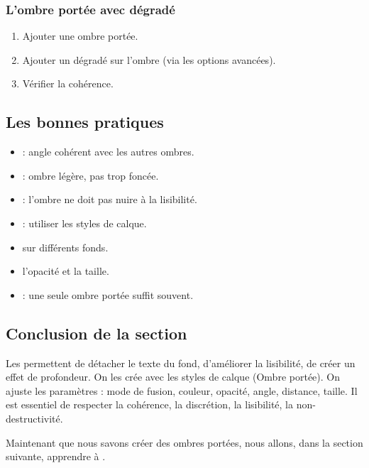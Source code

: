 \subsubsection{L'ombre portée avec dégradé}

\begin{enumerate}
    \item Ajouter une ombre portée.
    \item Ajouter un dégradé sur l'ombre (via les options avancées).
    \item Vérifier la cohérence.
\end{enumerate}

\subsection{Les bonnes pratiques}

\begin{itemize}
    \item {} : angle cohérent avec les autres ombres.
    \item {} : ombre légère, pas trop foncée.
    \item {} : l'ombre ne doit pas nuire à la lisibilité.
    \item {} : utiliser les styles de calque.
    \item {} sur différents fonds.
    \item {} l'opacité et la taille.
    \item {} : une seule ombre portée suffit souvent.
\end{itemize}

\subsection*{Conclusion de la section}

Les  permettent de détacher le texte du fond, d'améliorer la lisibilité, de créer un effet de profondeur. On les crée avec les styles de calque (Ombre portée). On ajuste les paramètres : mode de fusion, couleur, opacité, angle, distance, taille. Il est essentiel de respecter la cohérence, la discrétion, la lisibilité, la non-destructivité.

Maintenant que nous savons créer des ombres portées, nous allons, dans la section suivante, apprendre à .

